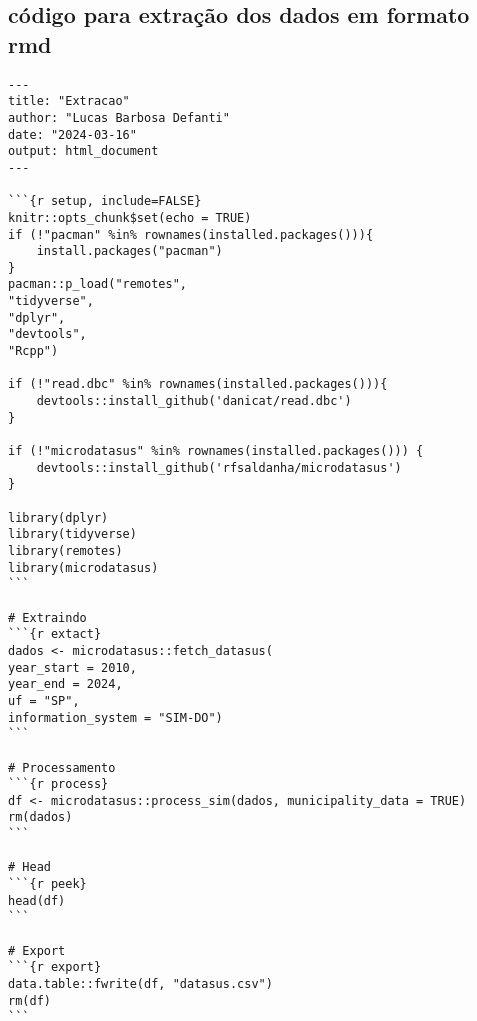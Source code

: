 
\begin{apendicesenv}
\partapendices
\chapter{c\'odigo para extra\c{c}\~ao dos dados em formato rmd}

\begin{verbatim}
---
title: "Extracao"
author: "Lucas Barbosa Defanti"
date: "2024-03-16"
output: html_document
---

```{r setup, include=FALSE}
knitr::opts_chunk$set(echo = TRUE)
if (!"pacman" %in% rownames(installed.packages())){
	install.packages("pacman")
}
pacman::p_load("remotes", 
"tidyverse", 
"dplyr",
"devtools",
"Rcpp")

if (!"read.dbc" %in% rownames(installed.packages())){
	devtools::install_github('danicat/read.dbc')
}

if (!"microdatasus" %in% rownames(installed.packages())) {
	devtools::install_github('rfsaldanha/microdatasus')
}

library(dplyr)
library(tidyverse)
library(remotes)
library(microdatasus)
```

# Extraindo
```{r extact}
dados <- microdatasus::fetch_datasus(
year_start = 2010,
year_end = 2024,
uf = "SP",
information_system = "SIM-DO")
```

# Processamento
```{r process}
df <- microdatasus::process_sim(dados, municipality_data = TRUE)
rm(dados)
```

# Head
```{r peek}
head(df)
```

# Export
```{r export}
data.table::fwrite(df, "datasus.csv")
rm(df)
```
\end{verbatim}



\end{apendicesenv}

